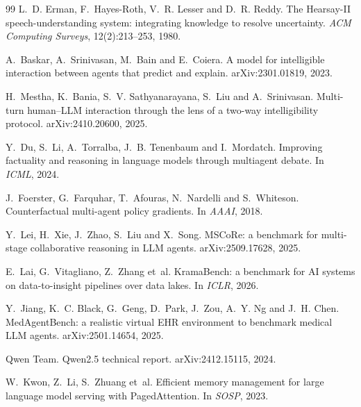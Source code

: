 \documentclass[11pt,a4paper,twocolumn]{article}
\begin{document}
\begin{thebibliography}{99}
\small
{}
L.~D. Erman, F.~Hayes-Roth, V.~R. Lesser and D.~R. Reddy.
\newblock The Hearsay-II speech-understanding system: integrating knowledge to resolve
uncertainty.
\newblock \emph{ACM Computing Surveys}, 12(2):213--253, 1980.

A.~Baskar, A.~Srinivasan, M.~Bain and E.~Coiera.
\newblock A model for intelligible interaction between agents that predict and explain.
\newblock arXiv:2301.01819, 2023.

H.~Mestha, K.~Bania, S.~V. Sathyanarayana, S.~Liu and A.~Srinivasan.
\newblock Multi-turn human--LLM interaction through the lens of a two-way intelligibility
protocol.
\newblock arXiv:2410.20600, 2025.

Y.~Du, S.~Li, A.~Torralba, J.~B. Tenenbaum and I.~Mordatch.
\newblock Improving factuality and reasoning in language models through multiagent debate.
\newblock In \emph{ICML}, 2024.

J.~Foerster, G.~Farquhar, T.~Afouras, N.~Nardelli and S.~Whiteson.
\newblock Counterfactual multi-agent policy gradients.
\newblock In \emph{AAAI}, 2018.

Y.~Lei, H.~Xie, J.~Zhao, S.~Liu and X.~Song.
\newblock MSCoRe: a benchmark for multi-stage collaborative reasoning in LLM agents.
\newblock arXiv:2509.17628, 2025.

E.~Lai, G.~Vitagliano, Z.~Zhang et~al.
\newblock KramaBench: a benchmark for AI systems on data-to-insight pipelines over data lakes.
\newblock In \emph{ICLR}, 2026.

Y.~Jiang, K.~C. Black, G.~Geng, D.~Park, J.~Zou, A.~Y. Ng and J.~H. Chen.
\newblock MedAgentBench: a realistic virtual EHR environment to benchmark medical LLM agents.
\newblock arXiv:2501.14654, 2025.

Qwen Team.
\newblock Qwen2.5 technical report.
\newblock arXiv:2412.15115, 2024.

W.~Kwon, Z.~Li, S.~Zhuang et~al.
\newblock Efficient memory management for large language model serving with PagedAttention.
\newblock In \emph{SOSP}, 2023.
\end{thebibliography}
\end{document}

